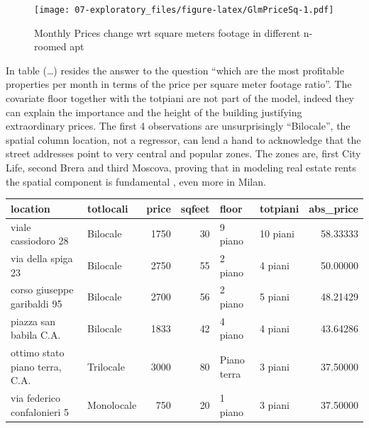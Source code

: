\documentclass[
  12pt,
  a4paper,
  oneside]{book}
\theoremstyle{definition}
\theoremstyle{definition}
\theoremstyle{definition}
\theoremstyle{remark}
\begin{document}
\begin{figure}
\centering
\texttt{[image: 07-exploratory\_files/figure-latex/GlmPriceSq-1.pdf]}
\caption{\label{fig:GlmPriceSq}Monthly Prices change wrt square meters footage in different n-roomed apt}
\end{figure}

In table (\ldots) resides the answer to the question ``which are the most profitable properties per month in terms of the price per square meter footage ratio''. The covariate floor together with the totpiani are not part of the model, indeed they can explain the importance and the height of the building justifying extraordinary prices. The first 4 observations are unsurprisingly ``Bilocale'', the spatial column location, not a regressor, can lend a hand to acknowledge that the street addresses point to very central and popular zones. The zones are, first City Life, second Brera and third Moscova, proving that in modeling real estate rents the spatial component is fundamental , even more in Milan.

\begin{tabular}{llrrllr}
\toprule
location & totlocali & price & sqfeet & floor & totpiani & abs\_price\\
\midrule
viale cassiodoro 28 & Bilocale & 1750 & 30 & 9 piano & 10 piani & 58.33333\\
via della spiga 23 & Bilocale & 2750 & 55 & 2 piano & 4 piani & 50.00000\\
corso giuseppe garibaldi 95 & Bilocale & 2700 & 56 & 2 piano & 5 piani & 48.21429\\
piazza san babila C.A. & Bilocale & 1833 & 42 & 4 piano & 4 piani & 43.64286\\
ottimo stato piano terra, C.A. & Trilocale & 3000 & 80 & Piano terra & 3 piani & 37.50000\\
\addlinespace
via federico confalonieri 5 & Monolocale & 750 & 20 & 1 piano & 3 piani & 37.50000\\
\bottomrule
\end{tabular}
\end{document}
